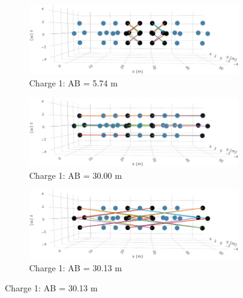 \documentclass[preprint,authoryear,12pt]{elsarticle}
\begin{document}
\begin{figure} [htp]
   \begin{center}
      \begin{subfigure}{0.7\linewidth}
         \includegraphics[trim=0cm 0cm 0cm 0cm, clip=true, width=\linewidth]{./figures/Fig20a.png}
         \caption{Charge 1: AB = 5.74 m}
         \label{fig:SurveyDesign_Charge1_ABsep5o745m}
      \end{subfigure}

      \begin{subfigure}{0.7\linewidth}
         \includegraphics[trim=0cm 0cm 0cm 0cm, clip=true, width=\linewidth]{./figures/Fig20b.png}
         \caption{Charge 1: AB = 30.00 m}
         \label{fig:SurveyDesign_Charge1_ABsep30m}
      \end{subfigure}

      \begin{subfigure}{0.7\linewidth}
         \includegraphics[trim=0cm 0cm 0cm 0cm, clip=true, width=\linewidth]{./figures/Fig20c.png}
         \caption{Charge 1: AB = 30.13 m}
         \label{fig:SurveyDesign_Charge1_ABsep30o13m}
      \end{subfigure}


\end{center}
\end{figure}
\end{document}
